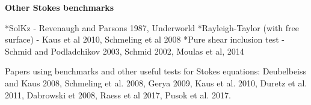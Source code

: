\documentclass[a4paper,11pt]{article}
\begin{document}
\textbf{Other Stokes benchmarks}

*SolKz - Revenaugh and Parsons 1987, Underworld
*Rayleigh-Taylor (with free surface) - Kaus et al 2010, Schmeling et al 2008
*Pure shear inclusion test - Schmid and Podladchikov 2003, Schmid 2002, Moulas et al, 2014

Papers using benchmarks and other useful tests for Stokes equations:
Deubelbeiss and Kaus 2008, Schmeling et al. 2008, Gerya 2009, Kaus et al. 2010, Duretz et al. 2011, Dabrowski et 2008, Raess et al 2017, Pusok et al. 2017.





\end{document}
